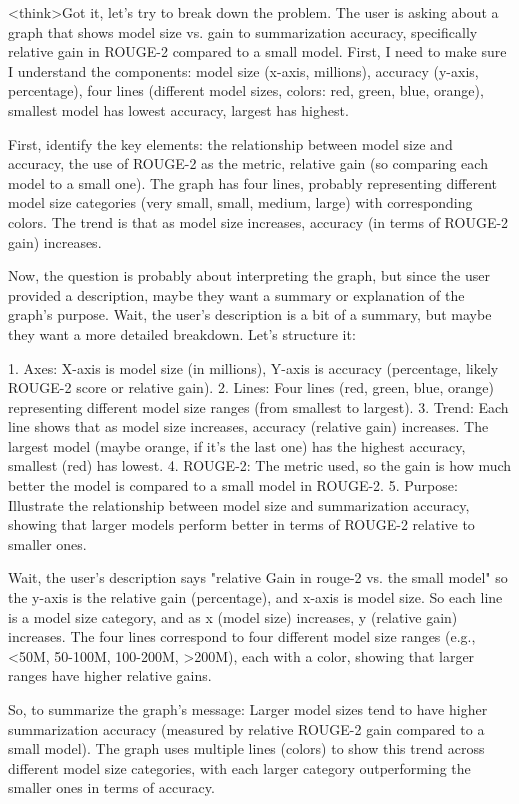 <think>Got it, let's try to break down the problem. The user is asking about a graph that shows model size vs. gain to summarization accuracy, specifically relative gain in ROUGE-2 compared to a small model. First, I need to make sure I understand the components: model size (x-axis, millions), accuracy (y-axis, percentage), four lines (different model sizes, colors: red, green, blue, orange), smallest model has lowest accuracy, largest has highest. 

First, identify the key elements: the relationship between model size and accuracy, the use of ROUGE-2 as the metric, relative gain (so comparing each model to a small one). The graph has four lines, probably representing different model size categories (very small, small, medium, large) with corresponding colors. The trend is that as model size increases, accuracy (in terms of ROUGE-2 gain) increases. 

Now, the question is probably about interpreting the graph, but since the user provided a description, maybe they want a summary or explanation of the graph's purpose. Wait, the user's description is a bit of a summary, but maybe they want a more detailed breakdown. Let's structure it:

1. Axes: X-axis is model size (in millions), Y-axis is accuracy (percentage, likely ROUGE-2 score or relative gain).
2. Lines: Four lines (red, green, blue, orange) representing different model size ranges (from smallest to largest).
3. Trend: Each line shows that as model size increases, accuracy (relative gain) increases. The largest model (maybe orange, if it's the last one) has the highest accuracy, smallest (red) has lowest.
4. ROUGE-2: The metric used, so the gain is how much better the model is compared to a small model in ROUGE-2.
5. Purpose: Illustrate the relationship between model size and summarization accuracy, showing that larger models perform better in terms of ROUGE-2 relative to smaller ones.

Wait, the user's description says "relative Gain in rouge-2 vs. the small model" so the y-axis is the relative gain (percentage), and x-axis is model size. So each line is a model size category, and as x (model size) increases, y (relative gain) increases. The four lines correspond to four different model size ranges (e.g., <50M, 50-100M, 100-200M, >200M), each with a color, showing that larger ranges have higher relative gains.

So, to summarize the graph's message: Larger model sizes tend to have higher summarization accuracy (measured by relative ROUGE-2 gain compared to a small model). The graph uses multiple lines (colors) to show this trend across different model size categories, with each larger category outperforming the smaller ones in terms of accuracy.

